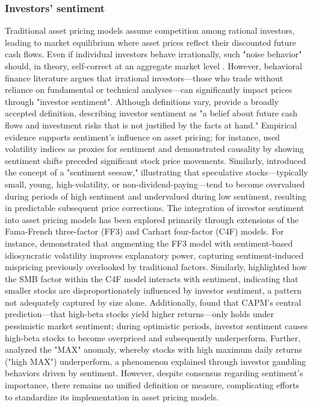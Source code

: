 \subsubsection{Investors' sentiment}
Traditional asset pricing models assume competition among rational investors, leading to market equilibrium where asset prices reflect their discounted future cash flows. Even if individual investors behave irrationally, such "noise behavior" should, in theory, self-correct at an aggregate market level \cite{friedman_1953}. However, behavioral finance literature argues that irrational investors—those who trade without reliance on fundamental or technical analyses—can significantly impact prices through "investor sentiment". Although definitions vary,  provide a broadly accepted definition, describing investor sentiment as "a belief about future cash flows and investment risks that is not justified by the facts at hand." Empirical evidence supports sentiment's influence on asset pricing; for instance,  used volatility indices as proxies for sentiment and demonstrated causality by showing sentiment shifts preceded significant stock price movements. Similarly,  introduced the concept of a "sentiment seesaw," illustrating that speculative stocks—typically small, young, high-volatility, or non-dividend-paying—tend to become overvalued during periods of high sentiment and undervalued during low sentiment, resulting in predictable subsequent price corrections.
The integration of investor sentiment into asset pricing models has been explored primarily through extensions of the Fama-French three-factor (FF3) and Carhart four-factor (C4F) models. For instance,  demonstrated that augmenting the FF3 model with sentiment-based idiosyncratic volatility improves explanatory power, capturing sentiment-induced mispricing previously overlooked by traditional factors. Similarly,  highlighted how the SMB factor within the C4F model interacts with sentiment, indicating that smaller stocks are disproportionately influenced by investor sentiment, a pattern not adequately captured by size alone. Additionally,  found that CAPM's central prediction—that high-beta stocks yield higher returns—only holds under pessimistic market sentiment; during optimistic periods, investor sentiment causes high-beta stocks to become overpriced and subsequently underperform. Further,  analyzed the "MAX" anomaly, whereby stocks with high maximum daily returns ("high MAX") underperform, a phenomenon explained through investor gambling behaviors driven by sentiment. However, despite consensus regarding sentiment's importance, there remains no unified definition or measure, complicating efforts to standardize its implementation in asset pricing models.



